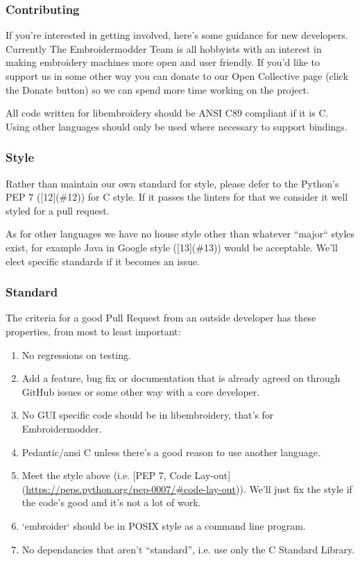 \documentclass[a4paper, 11pt]{report}
\begin{document}
\subsubsection{Contributing}

If you're interested in getting involved, here's some guidance
for new developers. Currently The Embroidermodder Team is all
hobbyists with an interest in making embroidery machines more
open and user friendly. If you'd like to support us in some other way
you can donate to our Open Collective page (click the Donate button) so
we can spend more time working on the project.

All code written for libembroidery should be ANSI C89 compliant
if it is C. Using other languages should only be used where
necessary to support bindings.

\subsubsection{ Style}

Rather than maintain our own standard for style, please defer to
the Python's PEP 7 ([12](\#12)) for C style.
If it passes the linters for that we consider it well styled
for a pull request.

As for other languages we have no house style other than whatever
``major`` styles exist, for example Java in
Google style ([13](\#13))
would be acceptable. We'll elect specific standards if it becomes
an issue.

\subsubsection{Standard}

The criteria for a good Pull Request from an outside developer has these properties, from most to least important:

\begin{enumerate}
\item No regressions on testing.
\item Add a feature, bug fix or documentation that is already agreed on through GitHub issues or some other way with a core developer.
\item No GUI specific code should be in libembroidery, that's for Embroidermodder.
\item Pedantic/ansi C unless there's a good reason to use another language.
\item Meet the style above (i.e. [PEP 7, Code Lay-out](\url{https://peps.python.org/pep-0007/#code-lay-out})).
   We'll just fix the style if the code's good and it's not a lot of work.
\item `embroider` should be in POSIX style as a command line program.
\item No dependancies that aren't ``standard'', i.e. use only the C Standard Library.
\end{enumerate}
\end{document}

